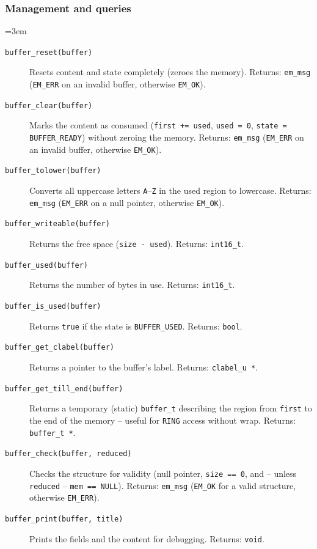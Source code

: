 \subsubsection*{Management and queries}
{\sloppy\emergencystretch=3em
\begin{description}
\item[\texttt{buffer\_reset(buffer)}] Resets content and state completely
  (zeroes the memory). Returns: \verb|em_msg| (\verb|EM_ERR| on an invalid
  buffer, otherwise \verb|EM_OK|).
\item[\texttt{buffer\_clear(buffer)}] Marks the content as consumed
  (\verb|first += used|, \verb|used = 0|, \verb|state = BUFFER_READY|) without
  zeroing the memory. Returns: \verb|em_msg| (\verb|EM_ERR| on an invalid
  buffer, otherwise \verb|EM_OK|).
\item[\texttt{buffer\_tolower(buffer)}] Converts all uppercase letters
  \texttt{A}--\texttt{Z} in the used region to lowercase. Returns: \verb|em_msg|
  (\verb|EM_ERR| on a null pointer, otherwise \verb|EM_OK|).
\item[\texttt{buffer\_writeable(buffer)}] Returns the free space
  (\verb|size - used|). Returns: \verb|int16_t|.
\item[\texttt{buffer\_used(buffer)}] Returns the number of bytes in use.
  Returns: \verb|int16_t|.
\item[\texttt{buffer\_is\_used(buffer)}] Returns \verb|true| if the state is
  \verb|BUFFER_USED|. Returns: \verb|bool|.
\item[\texttt{buffer\_get\_clabel(buffer)}] Returns a pointer to the buffer's
  label. Returns: \verb|clabel_u *|.
\item[\texttt{buffer\_get\_till\_end(buffer)}] Returns a temporary (static)
  \verb|buffer_t| describing the region from \verb|first| to the end of the
  memory -- useful for \verb|RING| access without wrap. Returns:
  \verb|buffer_t *|.
\item[\texttt{buffer\_check(buffer, reduced)}] Checks the structure for
  validity (null pointer, \verb|size == 0|, and -- unless \verb|reduced| --
  \verb|mem == NULL|). Returns: \verb|em_msg| (\verb|EM_OK| for a valid
  structure, otherwise \verb|EM_ERR|).
\item[\texttt{buffer\_print(buffer, title)}] Prints the fields and the content
  for debugging. Returns: \verb|void|.
\end{description}
\par}
